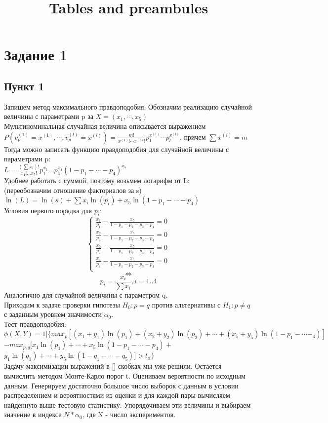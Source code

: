 \documentclass[a4paper, 12pt, oneside]{scrartcl}
\numberwithin{equation}{section}
\numberwithin{table}{section}
\numberwithin{figure}{section}
\begin{document}
\title{Tables and preambules}
\section*{Задание 1}
\subsection*{Пункт  1}
\renewcommand{\arraystretch}{2.5} %
Запишем метод максимального правдоподобия.
Обозначим реализацию случайной величины с параметрами p за $X=(x_1, \cdots, x_5)$ \\
Мультиноминальная случайная величина описывается выражением \\
$P(v_p^{(1)}=x^{(1)}, \cdots, v_p^{(l)}=x^{(l)}) = \frac{m!}{x^{(1)}!\cdots x^{(l)}!} p_1^{x^{(1)}}\cdots p_l^{x^{(l)}}$, причем
$\sum x^{(i)}=m$ \\
Тогда можно записать функцию правдоподобия для случайной величины с параметрами  p: \\
$L = \frac{(\sum x_i)!}{x_1!\ldots x_5!} p_1^{x_1} \ldots p_4^{x_4} (1-p_1-\cdots-p_4)^{x_5}$ \\
Удобнее работать с суммой, поэтому возьмем логарифм от L: \\
(переобозначим отношение факториалов за s) \\
$\ln(L) = \ln(s) + \sum x_i \ln(p_i) + x_5 \ln(1-p_1-\cdots-p_4)$
\\
Условия первого порядка для $p_i$: \\
\begin{equation*}
    \begin{cases}
        \frac{x_1}{p_1} - \frac{x_5}{1-p_1-p_2-p_3-p_4} = 0 \\
        \frac{x_2}{p_2} - \frac{x_5}{1-p_1-p_2-p_3-p_4} = 0 \\
         \frac{x_3}{p_3} - \frac{x_5}{1-p_1-p_2-p_3-p_4} = 0 \\
         \frac{x_4}{p_4} - \frac{x_5}{1-p_1-p_2-p_3-p_4} = 0 \\
     \end{cases}
 \end{equation*}
 $$ \Leftrightarrow $$
 $$ p_i = \frac{x_i}{\sum x_i}, i=1..4 $$
 Аналогично для случайной величины с параметром q. \\
 Приходим к задаче проверки гипотезы $H_0:p=q$ против альтернативы с $H_1:p \ne q$ с заданным уровнем значимости $\alpha_0$. \\
 Тест правдоподобия: \\
 $\phi(X, Y) = 1|\{max_p[(x_1+y_1)\ln(p_1) + (x_2+y_2)\ln(p_2)+\cdots+(x_5+y_5)\ln(1-p_1-\cdots-_4)]$ \\ 
 $- max_{p,q}[x_1\ln(p_1)+\cdots+x_5\ln(1-p_1-\cdots-p_4) + $
 $y_1\ln(q_1)+\cdots+y_5\ln(1-q_1-\cdots-q_5)]>t_{\alpha}\}$
 \\
 Задачу максимизации выражений в [] скобках мы уже решили. Остается вычислить методом Монте-Карло порог t. Оцениваем вероятности по
 исходным данным. Генерируем достаточно большое число выборок с данным в условии распределением и вероятностями из оценки
 и для каждой пары вычисляем найденную выше тестовую статистику.
 Упорядочиваем эти величины и выбираем значение в индексе $N*\alpha_0$, где N - число экспериментов.
\end{document}
